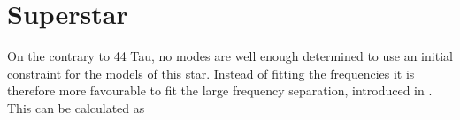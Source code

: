 \begin{figure}[htbp]
	\centering
	\caption{}
	\label{hrd44taulenz}
\end{figure}

\begin{figure}[htbp]
	\centering
	\caption{}
	\label{freqfit}
\end{figure}

\section{Superstar}

On the contrary to 44 Tau, no modes are well enough determined to use an initial constraint for the models of this star. Instead of fitting the frequencies it is therefore more favourable to fit the large frequency separation, introduced in . This can be calculated as

